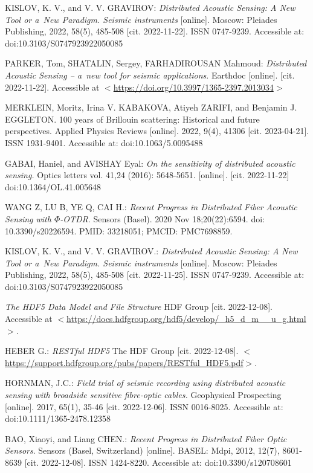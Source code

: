 \begin{thebibliography}{99}
KISLOV, K. V., and V. V. GRAVIROV: \emph{Distributed Acoustic Sensing: A New Tool or a~New Paradigm. Seismic instruments} [online]. Moscow: Pleiades Publishing, 2022, 58(5), 485-508 [cit. 2022-11-22]. ISSN 0747-9239. Accessible at: doi:10.3103/S0747923922050085

PARKER, Tom, SHATALIN, Sergey, FARHADIROUSAN Mahmoud: \emph{Distributed Acoustic Sensing – a~new tool for seismic applications}. Earthdoc [online]. [cit. 2022-11-22]. Accessible at \(<\)\url{https://doi.org/10.3997/1365-2397.2013034}\(>\)

MERKLEIN, Moritz, Irina V. KABAKOVA, Atiyeh ZARIFI, and Benjamin J. EGGLETON. 100 years of Brillouin scattering: Historical and future perspectives. Applied Physics Reviews [online]. 2022, 9(4), 41306 [cit. 2023-04-21]. ISSN 1931-9401. Accessible at: doi:10.1063/5.0095488

GABAI, Haniel, and AVISHAY Eyal: \emph{On the sensitivity of distributed acoustic sensing.} Optics letters vol. 41,24 (2016): 5648-5651. [online]. [cit. 2022-11-22] doi:10.1364/OL.41.005648

WANG Z, LU B, YE Q, CAI H.: \emph{Recent Progress in Distributed Fiber Acoustic Sensing with $\Phi$-OTDR}. Sensors (Basel). 2020 Nov 18;20(22):6594. doi: 10.3390/s20226594. PMID: 33218051; PMCID: PMC7698859.

KISLOV, K. V.,  and V. V. GRAVIROV.: \emph{Distributed Acoustic Sensing: A New Tool or a~New Paradigm. Seismic instruments} [online]. Moscow: Pleiades Publishing, 2022, 58(5), 485-508 [cit. 2022-11-25]. ISSN 0747-9239. Accessible at: doi:10.3103/S0747923922050085

\emph{The HDF5 Data Model and File Structure} HDF Group [cit. 2022-12-08]. Accessible at \(<\)\url{https://docs.hdfgroup.org/hdf5/develop/_h5_d_m__u_g.html}\(>\).

HEBER G.: \emph{RESTful HDF5} The HDF Group [cit. 2022-12-08].
\(<\)\url{https://support.hdfgroup.org/pubs/papers/RESTful_HDF5.pdf}\(>\).

HORNMAN, J.C.: \emph{Field trial of seismic recording using distributed acoustic sensing with broadside sensitive fibre-optic cables.} Geophysical Prospecting [online]. 2017, 65(1), 35-46 [cit. 2022-12-06]. ISSN 0016-8025. Accessible at: doi:10.1111/1365-2478.12358

BAO, Xiaoyi, and Liang CHEN.: \emph{Recent Progress in Distributed Fiber Optic Sensors}. Sensors (Basel, Switzerland) [online]. BASEL: Mdpi, 2012, 12(7), 8601-8639 [cit. 2022-12-08]. ISSN 1424-8220. Accessible at: doi:10.3390/s120708601


\end{thebibliography}
